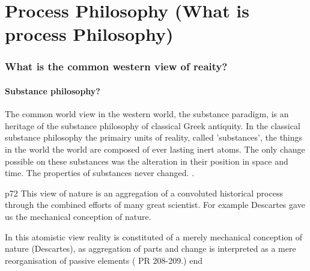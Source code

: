 
\chapter{Process Philosophy (What is process Philosophy)}




\subsection{What is the common western view of reaity?}

\subsubsection{Substance philosophy?}
The common world view in the western world, the substance paradigm, is an heritage of the substance philosophy of classical Greek antiquity.
In the classical substance philosophy the primairy units of reality, called 'substances', the things in the world the world are composed of ever lasting inert atoms. The only change possible on these substances was the alteration in their position in space and time. The properties of substances never changed.
\cite{rescher1996process,seibt-2013-sep,rescher-2012-sep}.


\cite[ch 5]{rapp1990whitehad}
p72
This view of nature is an aggregation of a convoluted historical process through the combined efforts of many great scientist. For example Descartes gave us the mechanical conception of nature.

In this atomistic view reality is constituted of a merely mechanical conception of nature (Descartes), as  aggregation of parts and change is interpreted as a mere reorganisation of passive elements ( PR 208-209.)
end



